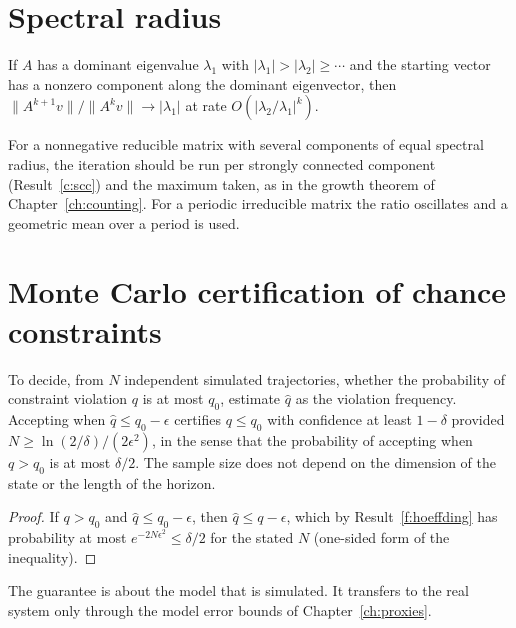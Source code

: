 \section{Spectral radius}

\begin{established}\label{g:power}
If $A$ has a dominant eigenvalue $\lambda_1$ with $|\lambda_1|>|\lambda_2|\ge\cdots$ and the starting vector has a nonzero component along the dominant eigenvector, then $\|A^{k+1}v\|/\|A^kv\|\to|\lambda_1|$ at rate $O(|\lambda_2/\lambda_1|^k)$.
\end{established}

For a nonnegative reducible matrix with several components of equal spectral radius, the iteration should be run per strongly connected component (Result~\ref{c:scc}) and the maximum taken, as in the growth theorem of Chapter~\ref{ch:counting}. For a periodic irreducible matrix the ratio oscillates and a geometric mean over a period is used.

\section{Monte Carlo certification of chance constraints}

\begin{newresult}\label{g:mc}
To decide, from $N$ independent simulated trajectories, whether the probability of constraint violation $q$ is at most $q_0$, estimate $\hat q$ as the violation frequency. Accepting when $\hat q\le q_0-\epsilon$ certifies $q\le q_0$ with confidence at least $1-\delta$ provided $N\ge\ln(2/\delta)/(2\epsilon^2)$, in the sense that the probability of accepting when $q>q_0$ is at most $\delta/2$. The sample size does not depend on the dimension of the state or the length of the horizon.
\end{newresult}
\begin{proof}
If $q>q_0$ and $\hat q\le q_0-\epsilon$, then $\hat q\le q-\epsilon$, which by Result~\ref{f:hoeffding} has probability at most $e^{-2N\epsilon^2}\le\delta/2$ for the stated $N$ (one-sided form of the inequality).
\end{proof}

The guarantee is about the model that is simulated. It transfers to the real system only through the model error bounds of Chapter~\ref{ch:proxies}.

